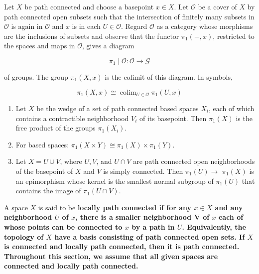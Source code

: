 \begin{theo}
    Let $X$ be path connected and choose a basepoint $x \in X$. Let $\mathscr{O}$ be a cover of $X$ by path connected open subsets such that the intersection of finitely many subsets in $\mathscr{O}$ is again in $\mathscr{O}$ and $x$ is in each $U \in \mathscr{O}$. Regard $\mathscr{O}$ as a category whose morphisms are the inclusions of subsets and observe that the functor $\pi_1(-, x)$, restricted to the spaces and maps in $\mathcal{O}$, gives a diagram
    
    $$
    \pi_1 \mid \mathscr{O}: \mathscr{O} \longrightarrow \mathscr{G}
    $$
    
    of groups. The group $\pi_1(X, x)$ is the colimit of this diagram. In symbols,
    
    $$
    \pi_1(X, x) \cong \operatorname{colim}_{U \in \mathscr{O}} \pi_1(U, x)
    $$
    
\end{theo}

\begin{coro}
    \begin{enumerate}
        \item Let $X$ be the wedge of a set of path connected based spaces $X_i$, each of which contains a contractible neighborhood $V_i$ of its basepoint. Then $\pi_1(X)$ is the free product of the groups $\pi_1\left(X_i\right)$.
        \item For based spaces: $\pi_1(X \times Y) \cong \pi_1(X) \times \pi_1(Y)$.
        \item Let $X=U \cup V$, where $U, V$, and $U \cap V$ are path connected open neighborhoods of the basepoint of $X$ and $V$ is simply connected. Then $\pi_1(U) \longrightarrow$ $\pi_1(X)$ is an epimorphism whose kernel is the smallest normal subgroup of $\pi_1(U)$ that contains the image of $\pi_1(U \cap V)$.
    \end{enumerate}
\end{coro}

A space $X$ is said to be \bf{locally path connected} if for any $x \in X$ and any neighborhood $U$ of $x$, there is a smaller neighborhood V of $x$ each of whose points can be connected to $x$ by a path in $U$. Equivalently, the topology of $X$ have a basis consisting of path connected open sets. If $X$ is connected and locally path connected, then it is path connected. Throughout this section, we assume that all given spaces are connected and locally path connected.\\

